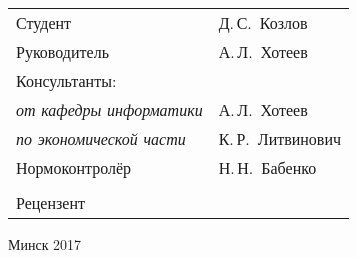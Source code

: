 \begin{titlepage}
\begin{center}
        \begin{tabular}{p{}p{}}
            Студент & Д.\,С.~Козлов \\
            Руководитель & А.\,Л.~Хотеев \\
            Консультанты: & \\
                \hspace*{3ex}\emph{от кафедры информатики} & А.\,Л.~Хотеев \\
                \hspace*{3ex}\emph{по экономической части} & К.\,Р.~Литвинович \\
            Нормоконтролёр & Н.\,Н.~Бабенко \\
            & \\
            Рецензент &
        \end{tabular}

        \vfill
        Минск 2017
    \end{center}
\end{titlepage}

\restoregeometry